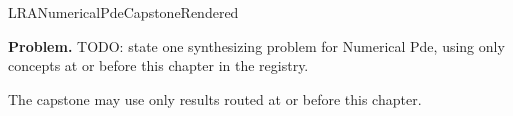 \ifcsname LRANumericalPdeCapstoneRendered\endcsname
\else
\expandafter\gdef\csname LRANumericalPdeCapstoneRendered\endcsname{}

\newpage
{}
\label{cap:numerical-pde}

\begin{tcolorbox}[
  colback=gray!6,
  colframe=gray!40,
  arc=2pt,
  left=8pt, right=8pt, top=6pt, bottom=6pt,
  title={\small\textbf{Capstone Problem}},
  fonttitle=\small\bfseries
]
\textbf{Problem.}
TODO: state one synthesizing problem for Numerical Pde, using only concepts at or
before this chapter in the registry.
\end{tcolorbox}

\begin{remark*}
The capstone may use only results routed at or before this chapter.
\end{remark*}

\clearpage
\fi
